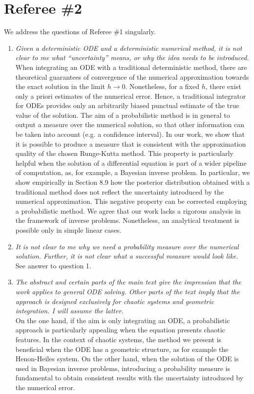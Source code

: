 \documentclass{siamart1116}
\numberwithin{theorem}{section}
\begin{document}
\section*{Referee \#2} We address the questions of Referee \#1 singularly.
\begin{enumerate}[label=\arabic{*}.]
\item \textit{Given a deterministic ODE and a deterministic numerical method, it is not clear to me what ``uncertainty'' means, or why the idea needs to be introduced.} \\
When integrating an ODE with a traditional deterministic method, there are theoretical guarantees of convergence of the numerical approximation towards the exact solution in the limit $h \to 0$. Nonetheless, for a fixed $h$, there exist only a priori estimates of the numerical error. Hence, a traditional integrator for ODEs provides only an arbitrarily biased punctual estimate of the true value of the solution. The aim of a probabilistic method is in general to output a measure over the numerical solution, so that other information can be taken into account (e.g. a confidence interval). In our work, we show that it is possible to produce a measure that is consistent with  the approximation quality of the chosen Runge-Kutta method. This property is particularly helpful when the solution of a differential equation is part of a wider pipeline of computation, as, for example, a Bayesian inverse problem. In particular, we show empirically in Section 8.9 how the posterior distribution obtained with a traditional method does not reflect the uncertainty introduced by the numerical approximation. This negative property can be corrected employing a probabilistic method. We agree that our work lacks a rigorous analysis in the framework of inverse problems. Nonetheless, an analytical treatment is possible only in simple linear cases.
\item \textit{It is not clear to me why we need a probability measure over the numerical solution. Further, it is not clear what a successful measure would look like.} \\
See answer to question 1.
\item \textit{The abstract and certain parts of the main text give the impression that the work applies to general ODE solving. Other parts of the text imply that the approach is designed exclusively for chaotic systems and geometric integration. I will assume the latter.} \\
On the one hand, if the aim is only integrating an ODE, a probabilistic approach is particularly appealing when the equation presents chaotic features. In the context of chaotic systems, the method we present is beneficial when the ODE has a geometric structure, as for example the Henon-Heiles system. On the other hand, when the solution of the ODE is used in Bayesian inverse problems, introducing a probability measure is fundamental to obtain consistent results with the uncertainty introduced by the numerical error.

\end{enumerate}
\end{document}
